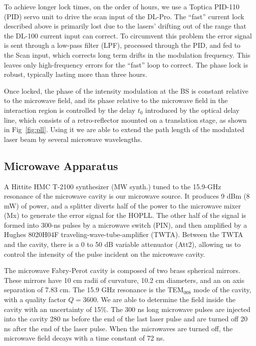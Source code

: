 \documentclass[aps,pra,reprint,groupedaddress]{revtex4-1}
\begin{document}
To achieve longer lock times, on the order of hours, we use a Toptica PID-110 (PID) servo unit to drive the scan input of the DL-Pro. The ``fast'' current lock described above is primarily lost due to the lasers' drifting out of the range that the DL-100 current input can correct. To circumvent this problem the error signal is sent through a low-pass filter (LPF), processed through the PID, and fed to the Scan input, which corrects long term drifts in the modulation frequency. This leaves only high-frequency errors for the ``fast'' loop to correct. The phase lock is robust, typically lasting more than three hours.

Once locked, the phase of the intensity modulation at the BS is constant relative to the microwave field, and its phase relative to the microwave field in the interaction region is controlled by the delay $t_0$ introduced by the optical delay line, which consists of a retro-reflector mounted on a translation stage, as shown in Fig~\ref{fig:pll}. Using it we are able to extend the path length of the modulated laser beam by several microwave wavelengths.

\subsection{\label{cavity} Microwave Apparatus}

A Hittite HMC T-2100 synthesizer (MW synth.) tuned to the 15.9-GHz resonance of the microwave cavity is our microwave source. It produces 9 dBm (8 mW) of power, and a splitter diverts half of the power to the microwave mixer (Mx) to generate the error signal for the HOPLL. The other half of the signal is formed into 300-ns pulses by a microwave switch (PIN), and then amplified by a Hughes 8020H04F traveling-wave-tube-amplifier (TWTA). Between the TWTA and the cavity, there is a 0 to 50 dB variable attenuator (Att2), allowing us to control the intensity of the pulse incident on the microwave cavity.

The microwave Fabry-Perot cavity is composed of two brass spherical mirrors. These mirrors have 10 cm radii of curvature, 10.2 cm diameters, and an on axis separation of 7.83 cm. The 15.9 GHz resonance is the TEM$_{008}$ mode of the cavity, with a quality factor $Q=3600$. We are able to determine the field inside the cavity with an uncertainty of 15\%. The 300 ns long microwave pulses are injected into the cavity 280 ns before the end of the last laser pulse and are turned off 20 ns after the end of the laser pulse. When the microwaves are turned off, the microwave field decays with a time constant of 72 ns.
\end{document}
